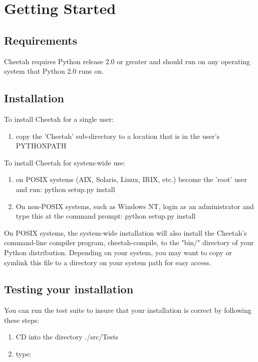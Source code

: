 \section{Getting Started}
\label{gettingStarted}

\subsection{Requirements}
Cheetah requires Python release 2.0 or greater and should run on any
operating system that Python 2.0 runs on.

\subsection{Installation}

To install Cheetah for a single user:
\begin{enumerate}
\item copy the 'Cheetah' sub-directory  to a location that is in the user's
     PYTHONPATH
\end{enumerate}

To install Cheetah for system-wide use:
\begin{enumerate}
\item on POSIX systems (AIX, Solaris, Linux, IRIX, etc.) become the 'root' user
     and run: python setup.py install
     
\item On non-POSIX systems, such as Windows NT, login as an administrator and
     type this at the command prompt:  python setup.py install
\end{enumerate}


On POSIX systems, the system-wide installation will also install the Cheetah's
command-line compiler program, cheetah-compile, to the "bin/" directory of your
Python distribution.  Depending on your system, you may want to copy or symlink
this file to a directory on your system path for easy access.


\subsection{Testing your installation}
You can run the test suite to insure that your installation is correct by
following these steps:
\begin{enumerate}
\item CD into the directory ./src/Tests   
\item type:  
\end{enumerate}

